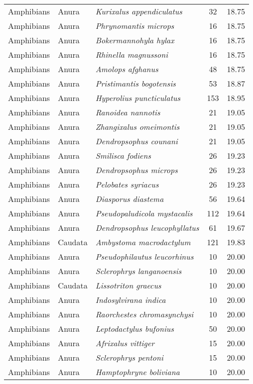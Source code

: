 \begin{longtable}{ll>{\itshape}lcc}
  Amphibians & Anura & Kurixalus appendiculatus &  32 & 18.75 \\ 
  Amphibians & Anura & Phrynomantis microps &  16 & 18.75 \\ 
  Amphibians & Anura & Bokermannohyla hylax &  16 & 18.75 \\ 
  Amphibians & Anura & Rhinella magnussoni &  16 & 18.75 \\ 
  Amphibians & Anura & Amolops afghanus &  48 & 18.75 \\ 
  Amphibians & Anura & Pristimantis bogotensis &  53 & 18.87 \\ 
  Amphibians & Anura & Hyperolius puncticulatus & 153 & 18.95 \\ 
  Amphibians & Anura & Ranoidea nannotis &  21 & 19.05 \\ 
  Amphibians & Anura & Zhangixalus omeimontis &  21 & 19.05 \\ 
  Amphibians & Anura & Dendropsophus counani &  21 & 19.05 \\ 
  Amphibians & Anura & Smilisca fodiens &  26 & 19.23 \\ 
  Amphibians & Anura & Dendropsophus microps &  26 & 19.23 \\ 
  Amphibians & Anura & Pelobates syriacus &  26 & 19.23 \\ 
  Amphibians & Anura & Diasporus diastema &  56 & 19.64 \\ 
  Amphibians & Anura & Pseudopaludicola mystacalis & 112 & 19.64 \\ 
  Amphibians & Anura & Dendropsophus leucophyllatus &  61 & 19.67 \\ 
  Amphibians & Caudata & Ambystoma macrodactylum & 121 & 19.83 \\ 
  Amphibians & Anura & Pseudophilautus leucorhinus &  10 & 20.00 \\ 
  Amphibians & Anura & Sclerophrys langanoensis &  10 & 20.00 \\ 
  Amphibians & Caudata & Lissotriton graecus &  10 & 20.00 \\ 
  Amphibians & Anura & Indosylvirana indica &  10 & 20.00 \\ 
  Amphibians & Anura & Raorchestes chromasynchysi &  10 & 20.00 \\ 
  Amphibians & Anura & Leptodactylus bufonius &  50 & 20.00 \\ 
  Amphibians & Anura & Afrixalus vittiger &  15 & 20.00 \\ 
  Amphibians & Anura & Sclerophrys pentoni &  15 & 20.00 \\ 
  Amphibians & Anura & Hamptophryne boliviana &  10 & 20.00 \\ 

\end{longtable}
